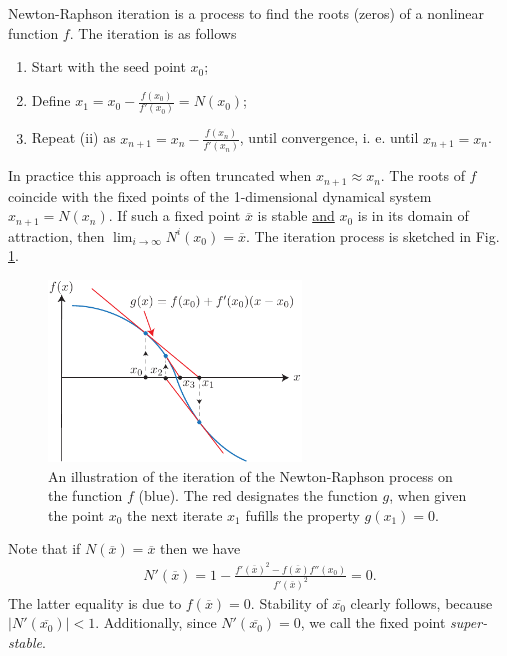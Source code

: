 \begin{ex}
	Newton-Raphson iteration is a process to find the roots (zeros) of a nonlinear function $f$. The iteration is as follows
	\begin{enumerate}
		\item Start with the seed point $x_0$;
		\item Define $x_1 = x_0 - \frac{f(x_0)}{f'(x_0)}= N(x_0)$;
		\item Repeat (ii) as $x_{n+1} = x_n - \frac{f(x_n)}{f'(x_n)}$, until convergence, i. e. until $x_{n+1}=x_n$.
	\end{enumerate}
	In practice this approach is often truncated when $x_{n+1}\approx x_{n}$. The roots of $f$ coincide with the fixed points of the 1-dimensional dynamical system $x_{n+1}= N(x_n)$. If such a fixed point $\overline{x}$ is stable \underline{and} $x_0 $ is in its domain of attraction, then $\lim_{i\to \infty }N^{i}(x_0)= \overline{x}$. The iteration process is sketched in Fig. \ref{fig:NR_iteration}.
\begin{figure}[h!]
	\centering
	\includegraphics[width=0.6\textwidth]{figures/ch7/1NR_iteration.pdf}
	\caption{An illustration of the iteration of the Newton-Raphson process on the function $f$ (blue). The red designates the function $g$, when given the point $x_0$ the next iterate $x_1$ fufills the property $g(x_1)=0$.}
	\label{fig:NR_iteration}
\end{figure}

Note that if $N(\overline{x}) = \overline{x}$ then we have
\begin{align}
	N'(\overline{x}) = 1 - \frac{f'(\overline{x})^{2} - f(\overline{x})f''(x_0)}{f'(\overline{x})^{2}}=0.
\end{align}
The latter equality is due to $f(\overline{x}) = 0$. Stability of $\overline{x_0}$ clearly follows, because $|N'(\overline{x_0})|<1$. Additionally, since $N'(\overline{x_0})=0$, we call the fixed point \emph{super-stable}.


\end{ex}
